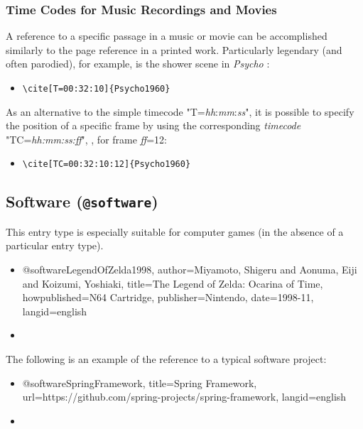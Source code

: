 \subsubsection{Time Codes for Music Recordings and Movies}

A reference to a specific passage in a music or movie can be accomplished
similarly to the page reference in a printed work. Particularly legendary
(and often parodied), for example, is the shower scene in \emph{Psycho}
\cite[T=00:32:10]{Psycho1960}:
%
\begin{itemize}
    \item[] \verb!\cite[T=00:32:10]{Psycho1960}!
\end{itemize}
%
As an alternative to the simple timecode "T=\emph{hh}:\emph{mm}:\emph{ss}",
it is possible to specify the position of a specific frame by using the
corresponding \emph{timecode} "TC=\emph{hh:mm:ss:ff}", \eg,
\cite[TC=00:32:10:12]{Psycho1960} for frame \emph{ff}=12:
%
\begin{itemize}
    \item[] \verb!\cite[TC=00:32:10:12]{Psycho1960}!
\end{itemize}

\subsection{Software (\texttt{\bfseries @software})}
\label{sec:@software}

This entry type is especially suitable for computer games (in the absence of a
particular entry type).
%
\begin{itemize}
\item[]
\begin{GenericCode}[numbers=none]
@software{LegendOfZelda1998,
  author={Miyamoto, Shigeru and Aonuma, Eiji and Koizumi, Yoshiaki},
  title={The Legend of Zelda: Ocarina of Time},
  howpublished={N64 Cartridge},
  publisher={Nintendo},
  date={1998-11},
  langid={english}
}
\end{GenericCode}
\item[\cite{LegendOfZelda1998}] 
\end{itemize}

\noindent
The following is an example of the reference to a typical software project:
%
\begin{itemize}
\item[]
\begin{GenericCode}[numbers=none]
@software{SpringFramework,
  title={Spring Framework},
  url={https://github.com/spring-projects/spring-framework},
  langid={english}
}
\end{GenericCode}
\item[\cite{SpringFramework}] 
\end{itemize}



